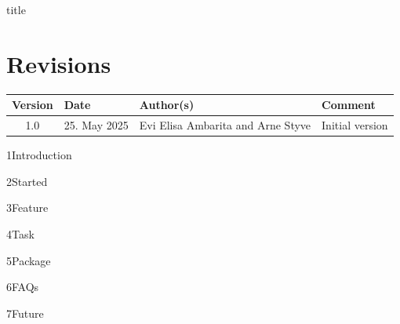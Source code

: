 \documentclass{article}
\let\oldsection\section %
\renewcommand{\section}{\clearpage\oldsection} %
\begin{document}
{title}

\frontmatter

\tableofcontents

\listoffigures

\newpage
\section*{Revisions}

\begin{table}[h]
    \centering
    \renewcommand{\arraystretch}{1.6} %
    \begin{tabular}{|c|l|l|p{5cm}|}
        \hline
        \textbf{Version} & \textbf{Date} & \textbf{Author(s)} & \textbf{Comment} \\
        \hline
        1.0 & 25. May 2025 & Evi Elisa Ambarita and Arne Styve & Initial version \\
        \hline
        \hline              
    \end{tabular}
\end{table}

\mainmatter

{1Introduction}

{2Started}

{3Feature}

{4Task}

{5Package}

{6FAQs}

{7Future}



\newpage
\printindex

\newpage
\printbibliography[heading = bibintoc, title = Bibliography]    %

\addappendix

\end{document}
